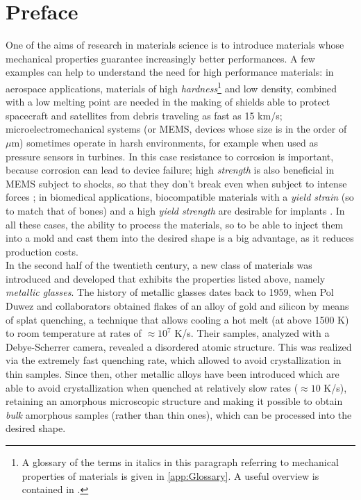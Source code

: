 \chapter*{Preface}

One of the aims of research in materials science is to introduce materials whose mechanical properties guarantee increasingly better performances.
A few examples can help to understand the need for high performance materials: in aerospace applications, materials of high \emph{hardness}\footnote{A glossary of the terms in italics in this paragraph referring to mechanical properties of materials is given in \autoref{app:Glossary}. A useful overview is contained in \cite{ashby2005materials}.} and low density, combined with a low melting point \cite{hamill2013hypervelocity} are needed in the making of shields able to protect spacecraft and satellites from debris traveling as fast as 15 km/s; microelectromechanical systems (or MEMS, devices whose size is in the order of $\mu$m) sometimes operate in harsh environments, for example when used as pressure sensors in turbines. In this case resistance to corrosion is important, because corrosion can lead to device failure; high \emph{strength} is also beneficial in MEMS subject to shocks, so that they don't break even when subject to intense forces \cite{schroers2007thermoplastic}; in biomedical applications, biocompatible materials with a \emph{yield strain} (so to match that of bones) and a high \emph{yield strength} are desirable for implants \cite{horton2003biomedical}. In all these cases, the ability to process the materials, so to be able to inject them into a mold and cast them into the desired shape is a big advantage, as it reduces production costs. \\

In the second half of the twentieth century, a new class of materials was introduced and developed that exhibits the properties listed above, namely \emph{metallic glasses}. The history of metallic glasses dates back to 1959, when Pol Duwez and collaborators \cite{klement1960noncrystalline} obtained flakes of an alloy of gold and silicon by means of splat quenching, a technique that allows cooling a hot melt (at above 1500 K) to room temperature at rates of $\approx 10^{7}$ K/s. Their samples, analyzed with a Debye-Scherrer camera, revealed a disordered atomic structure. This was realized via the extremely fast quenching rate, which allowed to avoid crystallization in thin samples.
Since then, other metallic alloys have been introduced which are able to avoid crystallization when quenched at relatively slow rates ($\approx 10$ K/s), retaining an amorphous microscopic structure and making it possible to obtain \emph{bulk} amorphous samples (rather than thin ones), which can be processed into the desired shape.

